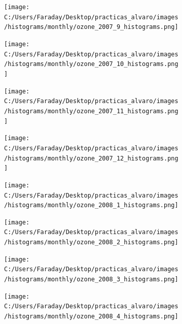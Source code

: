 \documentclass[12pt]{article}
\begin{document}
\begin{figure}[H]
\centering
\begin{subfigure}[h]{0.45\textwidth}
\texttt{[image: C:/Users/Faraday/Desktop/practicas\_alvaro/images/histograms/monthly/ozone\_2007\_9\_histograms.png]}
\caption{}
\label{fig:hist-mon-2-9-2007}
\end{subfigure}
%
\begin{subfigure}[H]{0.45\textwidth}
\texttt{[image: C:/Users/Faraday/Desktop/practicas\_alvaro/images/histograms/monthly/ozone\_2007\_10\_histograms.png]}
\caption{}
\label{fig:hist-mon-2-10-2007}
\end{subfigure}
\caption{}
\end{figure}

\begin{figure}[H]
\centering
\begin{subfigure}[h]{0.45\textwidth}
\texttt{[image: C:/Users/Faraday/Desktop/practicas\_alvaro/images/histograms/monthly/ozone\_2007\_11\_histograms.png]}
\caption{}
\label{fig:hist-mon-2-11-2007}
\end{subfigure}
%
\begin{subfigure}[H]{0.45\textwidth}
\texttt{[image: C:/Users/Faraday/Desktop/practicas\_alvaro/images/histograms/monthly/ozone\_2007\_12\_histograms.png]}
\caption{}
\label{fig:hist-mon-2-12-2007}
\end{subfigure}
\caption{}
\end{figure}

\newpage

\begin{figure}[H]
\centering
\begin{subfigure}[h]{0.45\textwidth}
\texttt{[image: C:/Users/Faraday/Desktop/practicas\_alvaro/images/histograms/monthly/ozone\_2008\_1\_histograms.png]}
\caption{}
\label{fig:hist-mon-2-1-2008}
\end{subfigure}
%
\begin{subfigure}[H]{0.45\textwidth}
\texttt{[image: C:/Users/Faraday/Desktop/practicas\_alvaro/images/histograms/monthly/ozone\_2008\_2\_histograms.png]}
\caption{}
\label{fig:hist-mon-2-2-2008}
\end{subfigure}
\caption{}
\end{figure}

\begin{figure}[H]
\centering
\begin{subfigure}[h]{0.45\textwidth}
\texttt{[image: C:/Users/Faraday/Desktop/practicas\_alvaro/images/histograms/monthly/ozone\_2008\_3\_histograms.png]}
\caption{}
\label{fig:hist-mon-2-3-2008}
\end{subfigure}
%
\begin{subfigure}[H]{0.45\textwidth}
\texttt{[image: C:/Users/Faraday/Desktop/practicas\_alvaro/images/histograms/monthly/ozone\_2008\_4\_histograms.png]}
\caption{}
\label{fig:hist-mon-2-4-2008}
\end{subfigure}
\caption{}
\end{figure}
\end{document}
